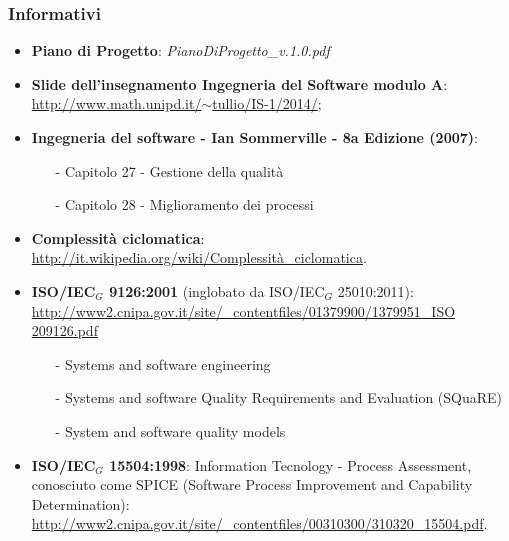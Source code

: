 \subsubsection{Informativi}
\begin{itemize}
	\item \textbf{Piano di Progetto}: \textit{PianoDiProgetto\_v.1.0.pdf}
	\item \textbf{Slide dell'insegnamento Ingegneria del Software modulo A}:\\ \href{http://www.math.unipd.it/~tullio/IS-1/2014/}{http://www.math.unipd.it/$\sim$tullio/IS-1/2014/};
	\item \textbf{Ingegneria del software - Ian Sommerville - 8a Edizione (2007)}:
	\begin{itemize}
		\item[-] Capitolo 27 - Gestione della qualità
		\item[-] Capitolo 28 - Miglioramento dei processi
	\end{itemize}
	\item \textbf{Complessità ciclomatica}: \href {http://it.wikipedia.org/wiki/Complessità\_ciclomatica}{http://it.wikipedia.org/wiki/Complessità\_ciclomatica}.
	\item \textbf{ISO/IEC$_G$ 9126:2001} (inglobato da ISO/IEC$_G$ 25010:2011):\\
	\href{http://www2.cnipa.gov.it/site/_contentfiles/01379900/1379951_ISO \%209126.pdf}{http://www2.cnipa.gov.it/site/\_contentfiles/01379900/1379951\_ISO  209126.pdf}
	\begin{itemize}
		\item[-] Systems and software engineering
		\item[-] Systems and software Quality Requirements and Evaluation (SQuaRE)
		\item[-] System and software quality models
	\end{itemize}
	\item \textbf{ISO/IEC$_G$ 15504:1998}: Information Tecnology - Process Assessment, conosciuto come SPICE (Software Process Improvement and Capability Determination): \href{http://www2.cnipa.gov.it/site/_contentfiles/00310300/310320_15504.pdf}{http://www2.cnipa.gov.it/site/\_contentfiles/00310300/310320\_15504.pdf}.
\end{itemize}